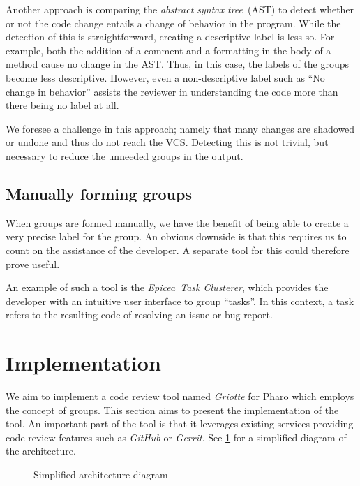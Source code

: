 \documentclass[conference,a4paper]{IEEEtran}
\newcommand{\Ep}{Epicea}
\newcommand{\Gr}{Griotte}
\begin{document}
Another approach is comparing the \textit{abstract syntax tree}\ (AST)
to detect whether or not the code change entails a change of behavior
in the program. While the detection of this is straightforward,
creating a descriptive label is less so. For example, both the
addition of a comment and a formatting in the body of a method cause
no change in the AST. Thus, in this case, the labels of the groups
become less descriptive. However, even a non-descriptive label such as
``No change in behavior'' assists the reviewer in understanding the
code more than there being no label at all.

We foresee a challenge in this approach; namely that many changes are
shadowed or undone and thus do not reach the
VCS\cite{Nega12a}. Detecting this is not trivial, but necessary to
reduce the unneeded groups in the output.

\subsection{Manually forming groups}
\label{sec:manu-form-groups}
When groups are formed manually, we have the benefit of being able to
create a very precise label for the group. An obvious downside is that
this requires us to count on the assistance of the developer. A
separate tool for this could therefore prove useful.

An example of such a tool is the \textit{\Ep\ Task
  Clusterer}\cite{Dias15a}, which provides the developer with an
intuitive user interface to group ``tasks''. In this context, a task
refers to the resulting code of resolving an issue or bug-report.

\section{Implementation}
\label{sec:implementation}
We aim to implement a code review tool named \textit{\Gr} for Pharo
which employs the concept of groups. This section aims to present the
implementation of the tool. An important part of the tool is that it
leverages existing services providing code review features such as
\textit{GitHub} or \textit{Gerrit}. See \cref{fig:diagram} for a
simplified diagram of the architecture.
\begin{figure}[t]
  \caption{Simplified architecture diagram}
  \label{fig:diagram}
\end{figure}
\end{document}
